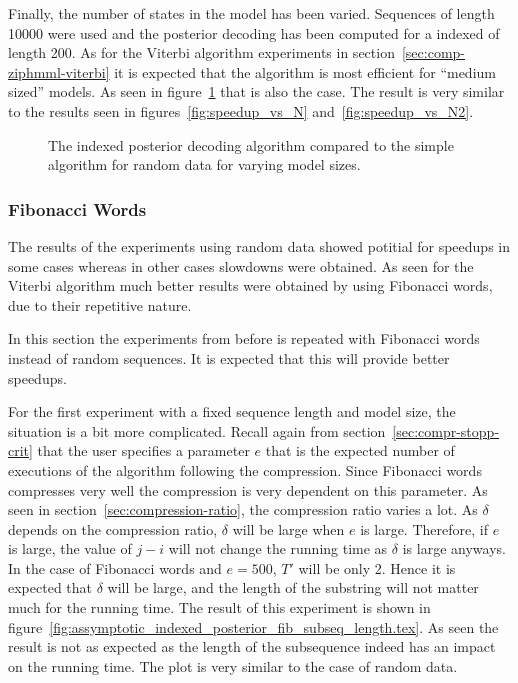Finally, the number of states in the model has been varied. Sequences of length
10000 were used and the posterior decoding has been computed for a indexed of
length 200. As for the Viterbi algorithm experiments in
section~\ref{sec:comp-ziphmml-viterbi} it is expected that the algorithm is
most efficient for ``medium sized'' models. As seen in
figure~\ref{fig:indexed_posterior_speedup_vs_N} that is also the case. The
result is very similar to the results seen in figures~\ref{fig:speedup_vs_N}
and~\ref{fig:speedup_vs_N2}.

\begin{figure}
  \centering
  
  \caption{The indexed posterior decoding algorithm compared to the simple
    algorithm for random data for varying model sizes.}
  \label{fig:indexed_posterior_speedup_vs_N}
\end{figure}

\subsubsection{Fibonacci Words}

The results of the experiments using random data showed potitial for speedups
in some cases whereas in other cases slowdowns were obtained. As seen for the
Viterbi algorithm much better results were obtained by using Fibonacci words,
due to their repetitive nature.

In this section the experiments from before is repeated with Fibonacci words
instead of random sequences. It is expected that this will provide better
speedups.

For the first experiment with a fixed sequence length and model size, the
situation is a bit more complicated. Recall again from
section~\ref{sec:compr-stopp-crit} that the user specifies a parameter $e$ that
is the expected number of executions of the algorithm following the
compression. Since Fibonacci words compresses very well the compression is very
dependent on this parameter. As seen in section~\ref{sec:compression-ratio},
the compression ratio varies a lot.  As $\delta$
depends on the compression ratio, $\delta$ will be large when $e$ is
large. Therefore, if $e$ is large, the value of $j - i$ will not change the
running time as $\delta$ is large anyways. In the case of Fibonacci words and
$e = 500$, $T'$ will be only 2. Hence it is expected that $\delta$ will be
large, and the length of the substring will not matter much for the running
time. The result of this experiment is shown in
figure~\ref{fig:assymptotic_indexed_posterior_fib_subseq_length.tex}. As seen
the result is not as expected as the length of the subsequence indeed has an
impact on the running time. The plot is very similar to the case of random
data. 

